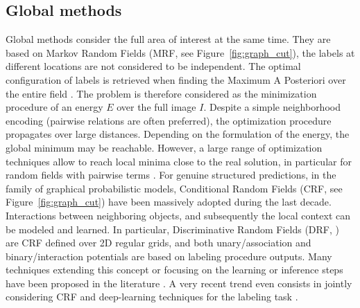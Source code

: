 \subsection{Global methods}
Global methods consider the full area of interest at the same time. They are based on Markov Random Fields (MRF, see Figure~\ref{fig:graph_cut}), the labels at different locations are not considered to be independent. The optimal configuration of labels is retrieved when finding the Maximum A Posteriori over the entire field \cite{Gab_MRF}. The problem is therefore considered as the minimization procedure of an energy $E$ over the full image $I$. Despite a simple neighborhood encoding (pairwise relations are often preferred), the optimization procedure propagates over large distances. Depending on the formulation of the energy, the global minimum may be reachable. However, a large range of optimization techniques allow to reach local minima close to the real solution, in particular for random fields with pairwise terms \cite{kolmogorov2004energy}. For genuine structured predictions, in the family of graphical probabilistic models, Conditional Random Fields (CRF, see Figure~\ref{fig:graph_cut}) have been massively adopted during the last decade. Interactions between neighboring objects, and subsequently the local context can be modeled and learned. In particular, Discriminative Random Fields (DRF, \cite{DRF}) are CRF defined over 2D regular grids, and both unary/association and binary/interaction potentials are based on labeling procedure outputs. Many techniques extending this concept or focusing on the learning or inference steps have been proposed in the literature \cite{ijcv_kohli09,Ladicky2012}. A very recent trend even consists in jointly considering CRF and deep-learning techniques for the labeling task \cite{CNN_CRF}.\\

